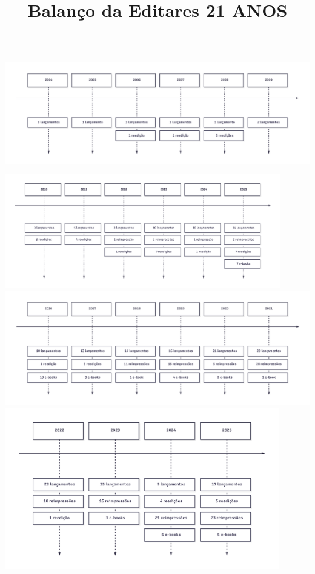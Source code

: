 \documentclass{gescons}
\title{Balanço da Editares 21 ANOS}
\begin{document}
    \makeentrevistatitle


    
    
\begin{center}
    
    \includegraphics[height=5cm]{articles/balanco/grafico/balanco1.png} 
    \includegraphics[height=5cm]{articles/balanco/grafico/balanco2.png}  
    \includegraphics[height=5cm]{articles/balanco/grafico/balanco3.png}  
    \includegraphics[height=7cm]{articles/balanco/grafico/balanco4.png}  

\end{center}
    


\end{document}
